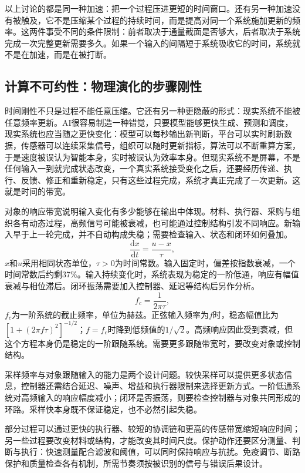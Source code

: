 以上讨论的都是同一种加速：把一个过程压进更短的时间窗口。还有另一种加速没有被触及，它不是压缩某个过程的持续时间，而是提高对同一个系统施加更新的频率。这两件事受不同的条件限制：前者取决于通量截面是否够大，后者取决于系统完成一次完整更新需要多久。如果一个输入的间隔短于系统吸收它的时间，系统就不是在加速，而是在被打断。

\subsection{计算不可约性：物理演化的步骤刚性}

时间刚性不只是过程不能任意压缩。它还有另一种更隐蔽的形式：现实系统不能被任意频率更新。AI很容易制造一种错觉，只要模型能够更快生成、预测和调度，现实系统也应当随之更快变化：模型可以每秒输出新判断，平台可以实时刷新数据，传感器可以连续采集信号，组织可以随时更新指标，算法可以不断重算方案，于是速度被误认为智能本身，实时被误认为效率本身。但现实系统不是屏幕，不是任何输入一到就完成状态改变，一个真实系统接受变化之后，还要经历传递、执行、反馈、修正和重新稳定，只有这些过程完成，系统才真正完成了一次更新。这就是时间的带宽。


对象的响应带宽说明输入变化有多少能够在输出中体现。材料、执行器、采购与组织各有动态过程，高频信号可能被衰减，也可能通过控制结构引发不同响应。新输入早于上一轮完成，并不自动构成失稳；需要检查输入、状态和闭环如何叠加。
\begin{equation}
\frac{\mathrm{d}x}{\mathrm{d}t}=\frac{u-x}{\tau},
\label{eq:relaxation}
\end{equation}
$x$和$u$采用相同状态单位，$\tau>0$为时间常数。输入固定时，偏差按指数衰减，一个时间常数后约剩37\%。输入持续变化时，系统表现为稳定的一阶低通，响应有幅值衰减与相位滞后。闭环振荡需要加入控制器、延迟等结构后另作分析。
\begin{equation}
f_c=\frac{1}{2\pi\tau},
\label{eq:cutoff}
\end{equation}
$f_c$为一阶系统的截止频率，单位为赫兹。正弦输入频率为$f$时，稳态幅值比为$[1+(2\pi f\tau)^2]^{-1/2}$；$f=f_c$时降到低频值的$1/\sqrt2$。高频响应因此受到衰减，但这个方程本身仍是稳定的一阶跟随系统。需要更多跟随带宽时，要改变对象或控制结构。

采样频率与对象跟随输入的能力是两个设计问题。较快采样可以提供更多状态信息，控制器还需结合延迟、噪声、增益和执行器限制来选择更新方式。一阶低通系统对高频输入的响应幅度减小；闭环是否振荡，则要检查控制器与对象共同形成的环路。采样快本身既不保证稳定，也不必然引起失稳。

部分过程可以通过更快的执行器、较短的协调链和更高的传感带宽缩短响应时间；另一些过程要改变材料或结构，才能改变其时间尺度。保护动作还要区分测量、判断与执行：快速测量配合滤波和阈值，可以同时保持响应与抗扰。免疫调节、断路保护和质量检查各有机制，所需节奏须按被识别的信号与错误后果设计。

